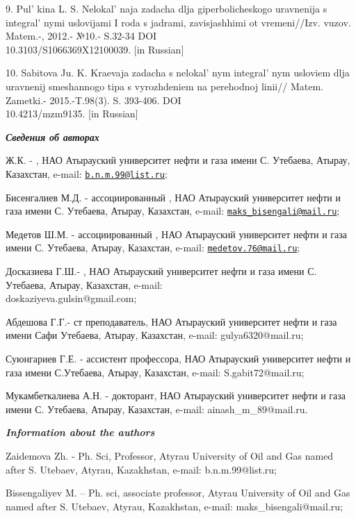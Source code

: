 \begin{references}
9. Pul' kina L. S. Nelokal' naja zadacha
dlja giperbolicheskogo uravnenija s integral' nymi
uslovijami I roda s jadrami, zavisjashhimi ot vremeni//Izv. vuzov.
Matem.-, 2012.- №10.- S.32-34 DOI \\10.3103/S1066369X12100039. {[}in
Russian{]}

10. Sabitova Ju. K. Kraevaja zadacha s nelokal' nym
integral' nym usloviem dlja uravnenij smeshannogo tipa s
vyrozhdeniem na perehodnoj linii// Matem. Zametki.- 2015.-T.98(3). S.
393-406. DOI \\10.4213/mzm9135. {[}in Russian{]}
\end{references}

\begin{authorinfo}
\emph{{\bfseries Сведения об авторах}}

Ж.К. - , НАО
Атырауский университет нефти и газа имени С. Утебаева, Атырау,
Казахстан, e-mail: \href{mailto:b.n.m.99@list.ru}{\nolinkurl{b.n.m.99@list.ru}};

Бисенгалиев М.Д. -  ассоциированный
, НАО Атырауский университет нефти и газа имени С.
Утебаева, Атырау, Казахстан, e-mail: \href{mailto:maks\_bisengali@mail.ru}{\nolinkurl{maks\_bisengali@mail.ru}};

Медетов Ш.М. -  ассоциированный
, НАО Атырауский университет нефти и газа имени С.
Утебаева, Атырау, Казахстан, e-mail: \href{mailto:medetov.76@mail.ru}{\nolinkurl{medetov.76@mail.ru}};

Досказиева Г.Ш.- , НАО
Атырауский университет нефти и газа имени С. Утебаева, Атырау,
Казахстан, e-mail: \\doskaziyeva.gulsin@gmail.com;

Абдешова Г.Г.- ст преподаватель, НАО Атырауский университет нефти и газа
имени Сафи Утебаева, Атырау, Казахстан, e-mail: gulya6320@mail.ru;

Суюнгариев Г.Е. -  ассистент профессора,
НАО Атырауский университет нефти и газа имени С.Утебаева, Атырау,
Казахстан, e-mail: S.gabit72@mail.ru;

Мукамбеткалиева А.Н. - докторант, НАО Атырауский университет нефти и
газа имени С. Утебаева, Атырау, Казахстан, e-mail: ainash\_m\_89@mail.ru.

\emph{{\bfseries Information about the authors}}

Zaidemova Zh. - Ph. Sci, Professor, Atyrau University of Oil and Gas
named after S. Utebaev, Atyrau, Kazakhstan, e-mail:
b.n.m.99@list.ru;

Bissengaliyev M. -- Ph. sci, associate professor, Atyrau University of
Oil and Gas named after S. Utebaev, Atyrau, Kazakhstan, e-mail:
maks\_bisengali@mail.ru;


\end{authorinfo}
